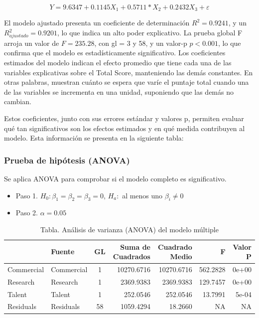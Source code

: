 \documentclass[
]{article}
\begin{document}
\begin{multicols}{2}
\[
Y = 9.6347 + 0.1145 X_1 + 0.5711 * X_2 + 0.2432 X_3 + \varepsilon
\]

El modelo ajustado presenta un coeficiente de determinación \( R^2 = 0.9241\), y un \( R^2_{ajustado} = 0.9201\), lo que indica un alto poder explicativo. La prueba global F arroja un valor de \( F = 235.28\), con gl = 3 y 58, y un valor-p \( p < 0.001 \), lo que confirma que el modelo es estadísticamente significativo.
Los coeficientes estimados del modelo indican el efecto promedio que tiene cada una de las variables explicativas sobre el Total Score, manteniendo las demás constantes. En otras palabras, muestran cuánto se espera que varíe el puntaje total cuando una de las variables se incrementa en una unidad, suponiendo que las demás no cambian.

Estos coeficientes, junto con sus errores estándar y valores p, permiten evaluar qué tan significativos son los efectos estimados y en qué medida contribuyen al modelo. Esta información se presenta en la siguiente tabla:


\subsubsection{Prueba de hipótesis (ANOVA)}

Se aplica ANOVA para comprobar si el modelo completo es significativo.

\begin{itemize}
  \item Paso 1. \( H_0: \beta_1 = \beta_2 = \beta_3 = 0 \), \quad \( H_a: \) al menos uno \( \beta_i \neq 0 \)
  \item Paso 2. \( \alpha = 0.05 \)
\end{itemize}

\end{multicols}

\renewcommand{\arraystretch}{1.3}
\begin{footnotesize}
\begin{longtable}[t]{llcrrrr}
\caption{\label{tab:modelo_multip_anova}Tabla. Análisis de varianza (ANOVA) del modelo múltiple}\\
\toprule
  & Fuente & GL & Suma de Cuadrados & Cuadrado Medio & F & Valor P\\
\midrule
Commercial & Commercial & 1 & 10270.6716 & 10270.6716 & 562.2828 & 0e+00\\
Research & Research & 1 & 2369.9383 & 2369.9383 & 129.7457 & 0e+00\\
Talent & Talent & 1 & 252.0546 & 252.0546 & 13.7991 & 5e-04\\
Residuals & Residuals & 58 & 1059.4294 & 18.2660 & NA & NA\\
\bottomrule
\end{longtable}

\end{footnotesize}\renewcommand{\arraystretch}{1}
\end{document}
